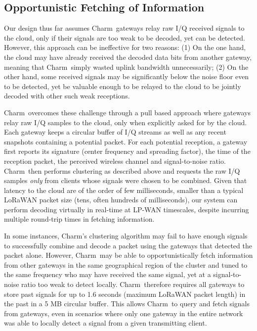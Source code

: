 \subsection{Opportunistic Fetching of Information}
Our design thus far assumes Charm\ gateways relay raw I/Q received signals to the cloud, only if their signals are too weak to be decoded, yet can be detected. However, this approach can be ineffective for two reasons: (1) On the one hand, the cloud may have already received the decoded data bits from another gateway, meaning that Charm\ simply wasted uplink bandwidth unnecessarily; (2) On the other hand, some received signals may be significantly below the noise floor even to be detected, yet be valuable enough to be relayed to the cloud to be jointly decoded with other such weak receptions.  \vspace*{0.1in}

 Charm\ overcomes these challenge through a pull based approach where gateways relay raw I/Q samples to the cloud, only when explicitly asked for by the cloud. Each gateway keeps a circular buffer of I/Q streams as well as any recent snapshots containing a potential packet. For each potential reception, a gateway first reports its signature (center frequency and spreading factor), the time of the reception packet, the perceived wireless channel and signal-to-noise ratio. Charm\ then performs clustering as described above and requests the raw I/Q samples {\it only } from clients whose signals were chosen to be combined. Given that latency to the cloud are of the order of few milliseconds, smaller than a typical LoRaWAN packet size (tens, often hundreds of milliseconds), our system can perform decoding virtually in real-time at LP-WAN timescales, despite incurring multiple round-trip times in fetching information.\vspace*{0.1in}

 In some instances, Charm's clustering algorithm may fail to have enough signals to successfully combine and decode a packet using the gateways that detected the packet alone. However, Charm\ may be able to opportunistically fetch information from other gateways in the same geographical region of the cluster and tuned to the same frequency who may have received the same signal, yet at a signal-to-noise ratio too weak to detect locally. Charm\ therefore requires all gateways to store past signals for up to 1.6 seconds (maximum LoRaWAN packet length) in the past in a 5 MB circular buffer. This allows Charm\ to query and fetch signals from gateways, even in scenarios where only one gateway in the entire network was able to locally detect a signal from a given transmitting client. 



